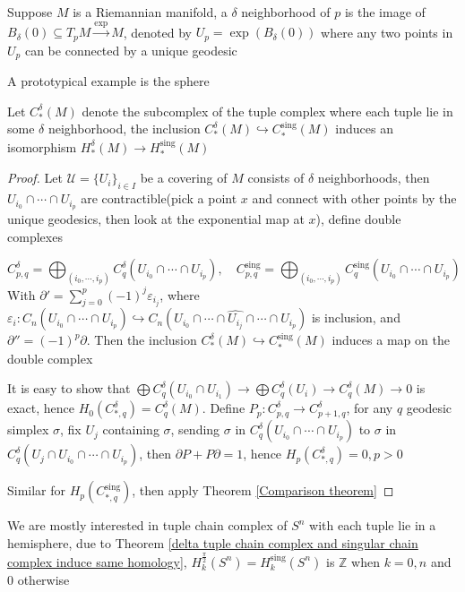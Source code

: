 \documentclass[../main.tex]{subfiles}
\begin{document}
\begin{definition}
Suppose $M$ is a Riemannian manifold, a $\delta$ neighborhood of $p$ is the image of $B_\delta(0)\subseteq T_pM\xrightarrow{\exp}M$, denoted by $U_p=\exp(B_\delta(0))$ where any two points in $U_p$ can be connected by a unique geodesic
\end{definition}

\begin{remark}
A prototypical example is the sphere
\end{remark}

\begin{theorem}\label{delta tuple chain complex and singular chain complex induce same homology}
Let $C^\delta_*(M)$ denote the subcomplex of the tuple complex where each tuple lie in some $\delta$ neighborhood, the inclusion $C^\delta_*(M)\hookrightarrow C^\mathrm{sing}_*(M)$ induces an isomorphism $H^\delta_*(M)\to H^\mathrm{sing}_*(M)$
\end{theorem}

\begin{proof}
Let $\mathcal U=\{U_i\}_{i\in I}$ be a covering of $M$ consists of $\delta$ neighborhoods, then $U_{i_0}\cap\cdots\cap U_{i_p}$ are contractible(pick a point $x$ and connect with other points by the unique geodesics, then look at the exponential map at $x$), define double complexes \par
\[C^\delta_{p,q}=\bigoplus_{(i_0,\cdots,i_p)}C^\delta_q(U_{i_0}\cap\cdots\cap U_{i_p}),\quad C^\mathrm{sing}_{p,q}=\bigoplus_{(i_0,\cdots,i_p)}C^\mathrm{sing}_q(U_{i_0}\cap\cdots\cap U_{i_p})\]
With $\partial'=\sum_{j=0}^p(-1)^{j}\varepsilon_{i_j}$, where $\varepsilon_i:C_n(U_{i_0}\cap\cdots\cap U_{i_p})\hookrightarrow C_n(U_{i_0}\cap\cdots\cap\widehat{U_{i_j}}\cap\cdots\cap U_{i_p})$ is inclusion, and $\partial''=(-1)^p\partial$. Then the inclusion $C^\delta_*(M)\hookrightarrow C^\mathrm{sing}_*(M)$ induces a map on the double complex \par
It is easy to show that $\bigoplus C^\delta_q(U_{i_0}\cap U_{i_1})\to\bigoplus C^\delta_q(U_{i})\to C^\delta_q(M)\to0$ is exact, hence $H_0(C^\delta_{*,q})=C^\delta_q(M)$. Define $P_p:C^\delta_{p,q}\to C^\delta_{p+1,q}$, for any $q$ geodesic simplex $\sigma$, fix $U_j$ containing $\sigma$, sending $\sigma$ in $C^\delta_q(U_{i_0}\cap\cdots\cap U_{i_p})$ to $\sigma$ in $C^\delta_q(U_j\cap U_{i_0}\cap\cdots\cap U_{i_p})$, then $\partial P+P\partial=1$, hence $H_p(C^\delta_{*,q})=0, p>0$ \par
Similar for $H_p(C^\mathrm{sing}_{*,q})$, then apply Theorem \ref{Comparison theorem}
\end{proof}

\begin{example}
We are mostly interested in tuple chain complex of $S^n$ with each tuple lie in a hemisphere, due to Theorem \ref{delta tuple chain complex and singular chain complex induce same homology}, $H^{\frac{\pi}{2}}_k(S^n)=H^\mathrm{sing}_k(S^n)$ is $\mathbb Z$ when $k=0,n$ and $0$ otherwise
\end{example}
\end{document}
